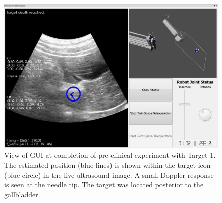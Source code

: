 \begin{figure}[!t]
\centering
\includegraphics[width = \columnwidth]{./Images/Chapter5/CadaverAtTarget/CadaverAtTarget.jpg}%
\caption[GUI at completion of pre-clinical experiment]{View of GUI at completion of pre-clinical experiment with Target 1. The estimated position (blue lines) is shown within the target icon (blue circle) in the live ultrasound image. A small Doppler response is seen at the needle tip. The target was located posterior to the gallbladder.}
\label{fig:CadaverAtTarget}
\end{figure}  

